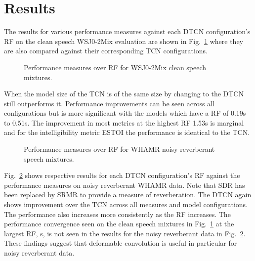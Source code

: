 \documentclass{article}
\begin{document}
\section{Results}\label{sec:results}
The results for various performance measures against each \ac{DTCN} configuration's \ac{RF} on the clean speech WSJ0-2Mix evaluation are shown in Fig.~\ref{fig:wsj02mix} where they are also compared against their corresponding \ac{TCN} configurations. 
\begin{figure}[!h]
    \centering
    \caption{Performance measures over \ac{RF} for WSJ0-2Mix clean speech mixtures.}
    \label{fig:wsj02mix}
\end{figure}
When the model size of the TCN is of the same size by changing  to  the DTCN still outperforms it.
Performance improvements can be seen across all configurations but is more significant with the models which have a \ac{RF} of 0.19s to 0.51s. The improvement in most metrics at the highest \ac{RF} 1.53s is marginal and for the intelligibility metric \ac{ESTOI} the performance is identical to the \ac{TCN}.


\begin{figure}[!h]
    \centering
    \caption{Performance measures over \ac{RF} for WHAMR noisy reverberant speech mixtures.}
    \label{fig:whamr}
\end{figure}
Fig.~\ref{fig:whamr} shows respective results for each \ac{DTCN} configuration's \ac{RF} against the performance measures on noisy reverberant WHAMR data. Note that SDR has been replaced by \ac{SRMR} to provide a measure of reverberation. The \ac{DTCN} again shows improvement over the \ac{TCN} across all measures and model configurations. The performance also increases more consistently as the \ac{RF} increases. The performance convergence seen on the clean speech mixtures in Fig.~\ref{fig:wsj02mix} at the largest \ac{RF}, s, is not seen in the results for the noisy reverberant data in Fig.~\ref{fig:whamr}. These findings suggest that deformable convolution is useful in particular for noisy reverberant data.
\end{document}
